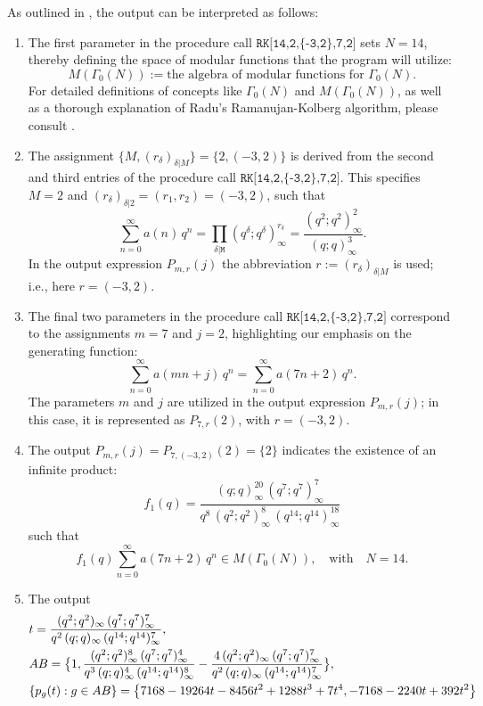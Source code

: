 \documentclass{article}
\begin{document}
As outlined in \cite{Andrews22}, the output can be interpreted as follows:
\begin{enumerate}
\item[$\bullet$] The first parameter in the procedure call $\texttt{RK[14,2,\{-3,2\},7,2]}$ sets $N = 14$, thereby defining the space of modular functions that the program will utilize:
$$
M(\Gamma_0(N)) := \text{the algebra of modular functions for } \Gamma_0(N).
$$
For detailed definitions of concepts like $\Gamma_0(N)$ and $M(\Gamma_0(N))$, as well as a thorough explanation of Radu's Ramanujan-Kolberg algorithm, please consult \cite{Paule}.
    \item[$\bullet$] The assignment $\{M, (r_\delta)_{\delta|M}\} = \{2, (-3, 2)\}$ is derived from the second and third entries of the procedure call $\texttt{RK[14,2,\{-3,2\},7,2]}$. This specifies $M = 2$ and $(r_\delta)_{\delta|2} = (r_1, r_2) = (-3, 2)$, such that
    $$
    \sum_{n=0}^\infty a(n)\, q^n = \prod_{\delta | \texttt M} (q^\delta;q^\delta)_\infty^{r_\delta} = \frac{(q^2;q^2)_\infty^2}{ (q;q)_\infty^3}.
    $$
    In the output expression $P_{m,r}(j)$ the abbreviation $r := (r_\delta)_{\delta|M}$ is used; i.e., here $r =(-3,2)$.
    \item[$\bullet$] The final two parameters in the procedure call $\texttt{RK[14,2,\{-3,2\},7,2]}$ correspond to the assignments $m = 7$ and $j = 2$, highlighting our emphasis on the generating function:
$$
\sum_{n=0}^\infty a(mn+j)\,q^n = \sum_{n=0}^\infty a(7n+2)\,q^n.
$$
The parameters $m$ and $j$ are utilized in the output expression $P_{m,r}(j)$; in this case, it is represented as $P_{7,r}(2)$, with $r = (-3, 2)$.
\item[$\bullet$]  The output $P_{m,r}(j) = P_{7,(-3,2)}(2) = \{2\}$ indicates the existence of an infinite product:
$$
f_1(q)=\frac{(q;q)_\infty^{20}\, (q^7;q^7)_\infty^7}{q^8\, (q^{2};q^{2})_\infty^8\, (q^{14};q^{14})_\infty^{18}}
$$
such that
$$
f_1(q)\sum_{n=0}^\infty a(7n+2)\,q^n \in M(\Gamma_0(N)),\quad\text{with}\quad N=14.
$$
\item[$\bullet$]  The output
\begin{align}
    & t=\frac{(q^2;q^2)_\infty\, (q^7;q^7)_\infty^7}{q^2\, (q;q)_\infty\, (q^{14};q^{14})_\infty^7},\notag \\ 
    & AB=\big\{1,\frac{(q^2;q^2)_\infty^8\, (q^7;q^7)_\infty^4}{q^3\, (q;q)_\infty^4\, (q^{14};q^{14})_\infty^8} - \dfrac{4\,(q^2;q^2)_\infty\, (q^7;q^7)_\infty^7 }{q^2\, (q;q)_\infty\, (q^{14};q^{14})_\infty^7}\big\},\notag \\
    & \{p_g(t):g\in AB\} = \left\{7168 - 19264 t - 8456 t^2 + 1288 t^3 + 7 t^4,-7168 - 2240 t + 392 t^2\right\}\label{eq5.2}

\end{align}
\end{enumerate}
\end{document}
